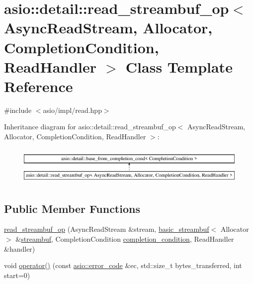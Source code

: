 \hypertarget{classasio_1_1detail_1_1read__streambuf__op}{}\section{asio\+:\+:detail\+:\+:read\+\_\+streambuf\+\_\+op$<$ Async\+Read\+Stream, Allocator, Completion\+Condition, Read\+Handler $>$ Class Template Reference}
\label{classasio_1_1detail_1_1read__streambuf__op}


{\ttfamily \#include $<$asio/impl/read.\+hpp$>$}

Inheritance diagram for asio\+:\+:detail\+:\+:read\+\_\+streambuf\+\_\+op$<$ Async\+Read\+Stream, Allocator, Completion\+Condition, Read\+Handler $>$\+:\begin{figure}[H]
\begin{center}
\leavevmode
\includegraphics[height=1.901528cm]{classasio_1_1detail_1_1read__streambuf__op}
\end{center}
\end{figure}
\subsection*{Public Member Functions}
\begin{DoxyCompactItemize}
\item 
\hyperlink{classasio_1_1detail_1_1read__streambuf__op_a63025076e85f597c0fe17b76a23d66c2}{read\+\_\+streambuf\+\_\+op} (Async\+Read\+Stream \&stream, \hyperlink{classasio_1_1basic__streambuf}{basic\+\_\+streambuf}$<$ Allocator $>$ \&\hyperlink{namespaceasio_a6a7ba348943527312eeace3492bf32ee}{streambuf}, Completion\+Condition \hyperlink{group__async__read_gae2e215d5013596cc2b385bb6c13fa518}{completion\+\_\+condition}, Read\+Handler \&handler)
\item 
void \hyperlink{classasio_1_1detail_1_1read__streambuf__op_acefb910e4a18a77c07795450495c07bb}{operator()} (const \hyperlink{classasio_1_1error__code}{asio\+::error\+\_\+code} \&ec, std\+::size\+\_\+t bytes\+\_\+transferred, int start=0)
\end{DoxyCompactItemize}
